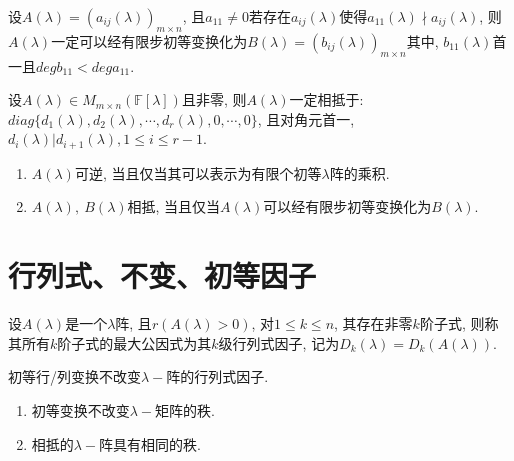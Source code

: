 
\begin{lemma}
    设$A(\lambda)=(a_{ij}(\lambda))_{m\times n}$, 且$a_11 \ne 0$若存在$a_{ij}(\lambda)$使得$a_{11}(\lambda)\nmid a_{ij}(\lambda)$, 
    则$A(\lambda)$一定可以经有限步初等变换化为$B(\lambda)=(b_{ij}(\lambda))_{m\times n}$其中, $b_{11}(\lambda)$首一且$degb_{11}<dega_{11}$.
\end{lemma}

\begin{theorem}
    设$A(\lambda)\in M_{m\times n}(\mathbb{F}[\lambda])$且非零, 则$A(\lambda)$一定相抵于:
    $diag\{d_1(\lambda),d_2(\lambda),\cdots,d_r(\lambda),0,\cdots,0\}$, 且对角元首一, $d_i(\lambda)|d_{i+1}(\lambda), 1\le i \le r-1$.
\end{theorem}

\begin{inference}
    \par
    \begin{enumerate}[itemindent=1em]
        \item $A(\lambda)$可逆, 当且仅当其可以表示为有限个初等$\lambda$阵的乘积.
        \item $A(\lambda),\ B(\lambda)$相抵, 当且仅当$A(\lambda)$可以经有限步初等变换化为$B(\lambda)$.
    \end{enumerate}
\end{inference}

\section{ 行列式、不变、初等因子 }

\begin{definition}[行列式因子]
    设$A(\lambda)$是一个$\lambda$阵, 且$r(A(\lambda)>0)$, 对$1\le k \le n$, 其存在非零$k$阶子式, 
    则称其所有$k$阶子式的最大公因式为其$k$级行列式因子, 记为$D_k(\lambda)=D_k(A(\lambda))$.
\end{definition}

\begin{lemma}
    初等行/列变换不改变$\lambda -$阵的行列式因子.
\end{lemma}

\begin{inference}
    \par
    \begin{enumerate}[itemindent=1em]
        \item 初等变换不改变$\lambda-$矩阵的秩.
        \item 相抵的$\lambda-$阵具有相同的秩.
    \end{enumerate}
\end{inference}

